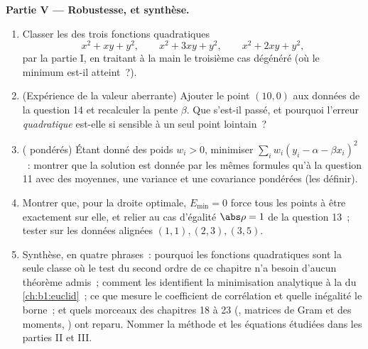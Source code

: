 \begin{problem}
\medskip
\noindent\textbf{Partie V --- Robustesse, et synthèse.}
\begin{enumerate}[resume]
  \item Classer les  des trois fonctions
        quadratiques
        \[
        x^2 + xy + y^2, \qquad x^2 + 3xy + y^2, \qquad
        x^2 + 2xy + y^2 ,
        \]
        par la partie I, en traitant à la main le troisième cas
        dégénéré (où le minimum est-il atteint~?).
  \item (Expérience de la valeur aberrante) Ajouter le point $(10,
        0)$ aux données de la question 14 et recalculer la pente
        $\beta$. Que s'est-il passé, et pourquoi l'erreur
        \emph{quadratique} est-elle si sensible à un seul point
        lointain~?
  \item ( pondérés) Étant donné des poids $w_i >
        0$, minimiser $\sum_i w_i(y_i - \alpha - \beta x_i)^2$~:
        montrer que la solution est donnée par les mêmes formules
        qu'à la question 11 avec des moyennes, une variance et une
        covariance pondérées (les définir).
  \item Montrer que, pour la droite optimale, $E_{\min} = 0$
        force tous les points à être exactement sur elle, et
        relier au cas d'égalité $\abs\rho = 1$ de la question
        13~; tester sur les données alignées $(1,1), (2,3),
        (3,5)$.
  \item Synthèse, en quatre phrases~: pourquoi les fonctions
        quadratiques sont la seule classe où le test du second
        ordre de ce chapitre n'a besoin d'aucun théorème admis~;
        comment les  identifient la
        minimisation analytique à la  du
        \cref{ch:b1:euclid}~; ce que mesure le coefficient de
        corrélation et quelle inégalité le borne~; et quels
        morceaux des chapitres 18 à 23 (, matrices de Gram
        et des moments, ) ont reparu. Nommer la
        méthode et les équations étudiées dans les parties II et
        III.
\end{enumerate}
\end{problem}

